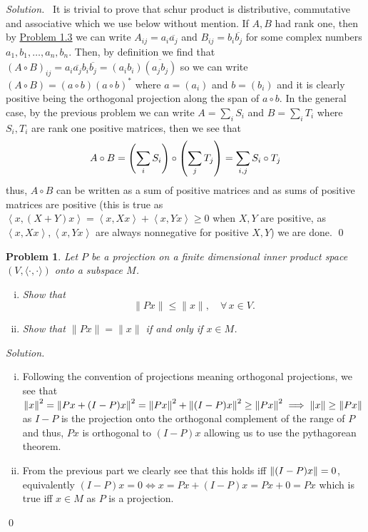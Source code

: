 \documentclass[12pt,a4paper]{article}
\newenvironment{solution}{%
  \par\noindent\textit{Solution.}\ }{\qed}
\theoremstyle{problemstyle}
\newtheorem{problem}{Problem}[section]
\newcommand{\ipp}[1]{{\left\langle{#1}\right\rangle}}
\begin{document}
\begin{solution}
	It is trivial to prove that schur product is distributive, commutative and associative which we use below without mention. 
	If $A,B$ had rank one, then by \hyperref[prob:4-3]{Problem 1.3} we can write $A_{ij}=a_i\overline{a_j}$ and $B_{ij}=b_i\overline{b_j}$ for some complex numbers $a_1,b_1,\ldots,a_n,b_n$. 
	Then, by definition we find that $(A\circ B)_{ij}=a_i\overline{a_j}b_i\overline{b_j}=(a_ib_i)\overline{(a_jb_j)}$ so we can write $(A\circ B)=(a\circ b)(a\circ b)^*$ where $a=(a_i)$ and $b=(b_i)$ and it is clearly positive being the orthogonal projection along the span of $a\circ b$. 
	In the general case, by the previous problem we can write $A=\sum_iS_i$ and $B=\sum_iT_i$ where $S_i,T_i$ are rank one positive matrices, then we see that
	\[
		A\circ B=\qty(\sum_i S_i)\circ\qty(\sum_j T_j)=\sum_{i,j}S_i\circ T_j
	\]
thus, $A\circ B$ can be written as a sum of positive matrices and as sums of positive matrices are positive (this is true as $\ipp{x,(X+Y)x}=\ipp{x,Xx}+\ipp{x,Yx}\geq 0$ when $X,Y$ are positive, as $\ipp{x,Xx},\ipp{x,Yx}$ are always nonnegative for positive $X,Y$) we are done. 
\end{solution}
\begin{problem}\label{prob:4-6}
Let $P$ be a projection on a finite dimensional inner product space $(V, \langle \cdot, \cdot \rangle)$ onto a subspace $M$.
\begin{enumerate}[(i)]
    \item Show that
    \[
    \|Px\| \leq \|x\|, \quad \forall\, x \in V.
    \]
    \item Show that $\|Px\| = \|x\|$ if and only if $x \in M$.
\end{enumerate}
\end{problem}
\begin{solution}
	\begin{enumerate}[(i)]
		\item Following the convention of projections meaning orthogonal projections, we see that $\norm{x}^2=\norm{Px+(I-P)x}^2=\norm{Px}^2+\norm{(I-P)x}^2\geq\norm{Px}^2\implies\norm{x}\geq\norm{Px}$ as $I-P$ is the projection onto the orthogonal complement of the range of $P$ and thus, $Px$ is orthogonal to $(I-P)x$ allowing us to use the pythagorean theorem.
		\item From the previous part we clearly see that this holds iff $\norm{(I-P)x}=0$, equivalently $(I-P)x=0\iff x=Px+(I-P)x=Px+0=Px$ which is true iff $x\in M$ as $P$ is a projection.
	\end{enumerate}
\end{solution}
\end{document}
